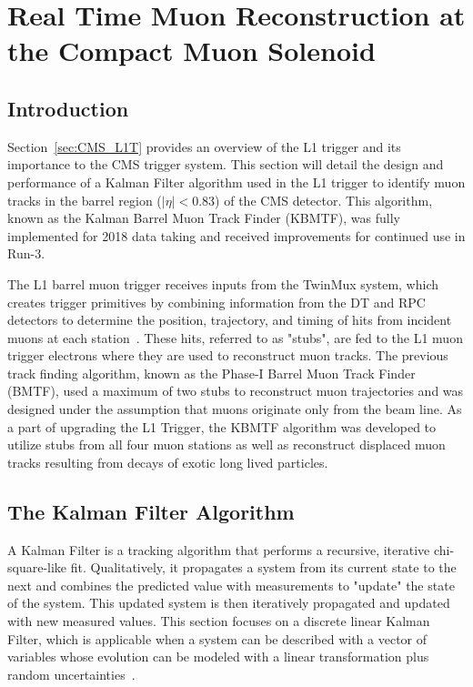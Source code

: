 
\chapter{Real Time Muon Reconstruction at the Compact Muon Solenoid}
\label{chap:kbmtf}

\section{Introduction} \label{sec:kbmtf_intro}
Section~\ref{sec:CMS_L1T} provides an overview of the L1 trigger and its importance to the CMS trigger system. This section will detail the design and performance of a Kalman Filter algorithm used in the L1 trigger to identify muon tracks in the barrel region ($|\eta|<0.83$) of the CMS detector. This algorithm, known as the Kalman Barrel Muon Track Finder (KBMTF), was fully implemented for 2018 data taking and received improvements for continued use in Run-3.

The L1 barrel muon trigger receives inputs from the TwinMux system, which creates trigger primitives by combining information from the DT and RPC detectors to determine the position, trajectory, and timing of hits from incident muons at each station~\cite{Triossi_2017}. These hits, referred to as "stubs", are fed to the L1 muon trigger electrons where they are used to reconstruct muon tracks. The previous track finding algorithm, known as the Phase-I Barrel Muon Track Finder (BMTF), used a maximum of two stubs to reconstruct muon trajectories and was designed under the assumption that muons originate only from the beam line. As a part of upgrading the L1 Trigger, the KBMTF algorithm was developed to utilize stubs from all four muon stations as well as reconstruct displaced muon tracks resulting from decays of exotic long lived particles.

\section{The Kalman Filter Algorithm} \label{sec:kalman_filter}
A Kalman Filter is a tracking algorithm that performs a recursive, iterative chi-square-like fit. Qualitatively, it propagates a system from its current state to the next and combines the predicted value with measurements to "update" the state of the system. This updated system is then iteratively propagated and updated with new measured values. This section focuses on a discrete linear Kalman Filter, which is applicable when a system can be described with a vector of variables whose evolution can be modeled with a linear transformation plus random uncertainties~\cite{FRUHWIRTH1987444}.

